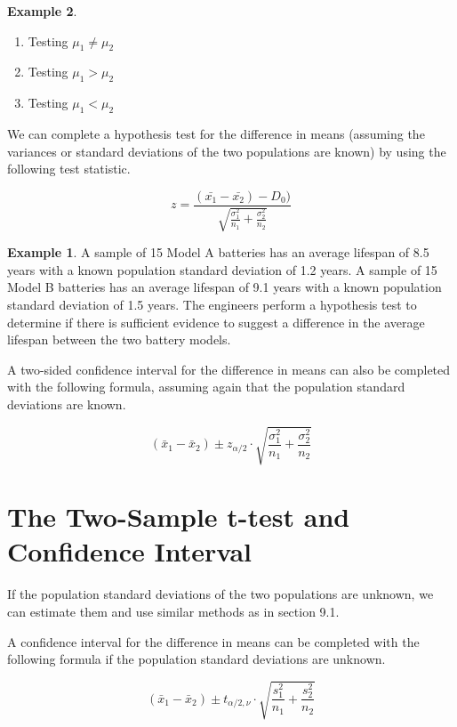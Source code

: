 \documentclass[
  11pt,
  oneside]{book}
\theoremstyle{definition}
\theoremstyle{definition}
\newtheorem{example}{Example}[chapter]
\theoremstyle{definition}
\theoremstyle{definition}
\theoremstyle{remark}
\begin{document}
\begin{example}
\begin{enumerate}
\def\labelenumi{(\alph{enumi})}
\item
  Testing \(\mu_1 \neq \mu_2\)
  \vfill
\item
  Testing \(\mu_1 > \mu_2\)
  \vfill
\item
  Testing \(\mu_1 < \mu_2\)
  \vfill
\end{enumerate}

\newpage

We can complete a hypothesis test for the difference in means (assuming the variances or standard deviations of the two populations are known) by using the following test statistic.

\[z= \frac{(\bar{x_1}-\bar{x_2})-D_0)}{\sqrt{\frac{\sigma_1^2}{n_1} + \frac{\sigma_2^2}{n_2}}}\]

\begin{example}
A sample of 15 Model A batteries has an average lifespan of 8.5 years with a known population standard deviation of 1.2 years. A sample of 15 Model B batteries has an average lifespan of 9.1 years with a known population standard deviation of 1.5 years. The engineers perform a hypothesis test to determine if there is sufficient evidence to suggest a difference in the average lifespan between the two battery models.
\end{example}

\vfill

A two-sided confidence interval for the difference in means can also be completed with the following formula, assuming again that the population standard deviations are known.

\[(\bar{x}_1-\bar{x}_2) \pm z_{\alpha/2} \cdot \sqrt{\frac{\sigma_1^2}{n_1}+\frac{\sigma_2^2}{n_2}}\]

\newpage

\section{The Two-Sample t-test and Confidence Interval}\label{the-two-sample-t-test-and-confidence-interval}

If the population standard deviations of the two populations are unknown, we can estimate them and use similar methods as in section 9.1.

A confidence interval for the difference in means can be completed with the following formula if the population standard deviations are unknown.

\[(\bar{x}_1-\bar{x}_2) \pm t_{\alpha/2,\nu} \cdot \sqrt{\frac{s_1^2}{n_1}+\frac{s_2^2}{n_2}}\]


\end{example}
\end{document}
